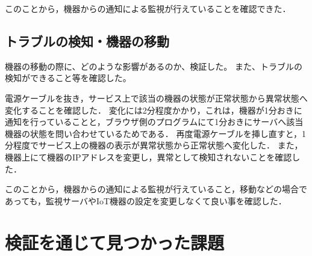 このことから，機器からの通知による監視が行えていることを確認できた．
\subsection{トラブルの検知・機器の移動}
機器の移動の際に、どのような影響があるのか、検証した。
また、トラブルの検知ができること等を確認した。

電源ケーブルを抜き，サービス上で該当の機器の状態が正常状態から異常状態へ変化することを確認した．
変化には2分程度かかり，これは，機器が1分おきに通知を行っていることと，ブラウザ側のプログラムにて1分おきにサーバへ該当機器の状態を問い合わせているためである．
再度電源ケーブルを挿し直すと，1分程度でサービス上の機器の表示が異常状態から正常状態へ変化した．
また，機器上にて機器のIPアドレスを変更し，異常として検知されないことを確認した．

このことから，機器からの通知による監視が行えていること，移動などの場合であっても，監視サーバやIoT機器の設定を変更しなくて良い事を確認した．

\section{検証を通じて見つかった課題}

